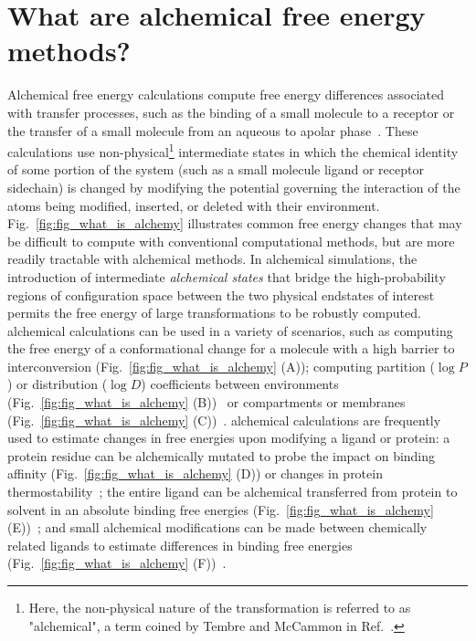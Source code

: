 \documentclass[9pt,bestpractices]{livecoms}
\begin{document}
\section{What are alchemical free energy methods?}
\label{sec:intro}
Alchemical free energy calculations compute free energy differences associated with transfer processes, such as the binding of a small molecule to a receptor or the transfer of a small molecule from an aqueous to apolar phase~\cite{zwanzig1954hightemperature}. 
These calculations use non-physical\footnote{Here, the non-physical nature of the transformation is referred to as "alchemical", a term coined by Tembre and McCammon in Ref.~\cite{tembre1984ligand}.} intermediate states in which the chemical identity of some portion of the system (such as a small molecule ligand or receptor sidechain) is changed by modifying the potential governing the interaction of the atoms being modified, inserted, or deleted with their environment. 
%
Fig.~\ref{fig:fig_what_is_alchemy} illustrates common free energy changes that may be difficult to compute with conventional computational methods, but are more readily tractable with alchemical methods. 
In alchemical simulations, the introduction of intermediate \textit{alchemical states} that bridge the high-probability regions of configuration space between the two physical endstates of interest permits the free energy of large transformations to be robustly computed.
alchemical calculations can be used in a variety of scenarios, such as computing the free energy of a conformational change for a molecule with a high barrier to interconversion (Fig.~\ref{fig:fig_what_is_alchemy} (A)); 
computing partition ($\log P$) or distribution ($\log D$) coefficients between environments (Fig.~\ref{fig:fig_what_is_alchemy} (B))~\cite{rustenburg2016measuring, bosisio2016blinded} or compartments or membranes (Fig.~\ref{fig:fig_what_is_alchemy} (C))~\cite{}. 
alchemical calculations are frequently used to estimate changes in free energies upon modifying a ligand or protein: a protein residue can be alchemically mutated to probe the impact on binding affinity (Fig.~\ref{fig:fig_what_is_alchemy} (D))\cite{hauser2018predicting,aldeghi2018accurate} or changes in protein thermostability~\cite{seeliger2010protein,gapsys2016insights,gapsys2016accurate,aldeghi2019accurate}; the entire ligand can be alchemical transferred from protein to solvent in an absolute binding free energies (Fig.~\ref{fig:fig_what_is_alchemy} (E))~\cite{mobley2007predicting,aldeghi2016accurate,aldeghi2017predictions}; and small alchemical modifications can be made between chemically related ligands to estimate differences in binding free energies (Fig.~\ref{fig:fig_what_is_alchemy} (F))~\cite{wang2015accurate,mey2016blinded,gapsys2020large}.
\end{document}
